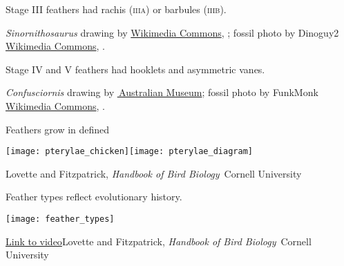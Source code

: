 \documentclass[t]{beamer}
\begin{document}
{
\begin{frame}[t,plain]{Stage III feathers had rachis (\textsc{iiia}) or barbules (\textsc{iiib}).}

\vfilll

\tiny \hfill \textit{Sinornithosaurus} drawing by \href{https://commons.wikimedia.org/w/index.php?curid=4806736}{Wikimedia Commons}, ; fossil photo by Dinoguy2 \href{https://commons.wikimedia.org/w/index.php?curid=1090907}{Wikimedia Commons}, .

\end{frame}
}
%
{
\begin{frame}[t,plain]{Stage IV and V feathers had hooklets and asymmetric vanes.}

\vfilll

\tiny \hfill \textit{Confusciornis} drawing by \href{https://australian.museum/learn/dinosaurs/the-first-birds/}{\textcopyright\,Australian Museum}; fossil photo by FunkMonk \href{https://en.wikipedia.org/wiki/File:Confuciusornis_male.jpg}{Wikimedia Commons}, .

\end{frame}
}
%
\begin{frame}[t,plain]{Feathers grow in defined }

\vspace{-0.75\baselineskip}

\texttt{[image: pterylae\_chicken]}\hfill \texttt{[image: pterylae\_diagram]}

	\vfilll

	\tiny \hfill Lovette and Fitzpatrick, \textit{Handbook of Bird Biology} \textcopyright\,Cornell University

\end{frame}
%
\begin{frame}[t,plain]{Feather types reflect evolutionary history.}


\texttt{[image: feather\_types]}\\

	\vfilll


	\tiny \href{https://www.youtube.com/watch?v=MdNyeasi0GI}{Link to video}\hfill Lovette and Fitzpatrick, \textit{Handbook of Bird Biology} \textcopyright\,Cornell University

\end{frame}
\end{document}

